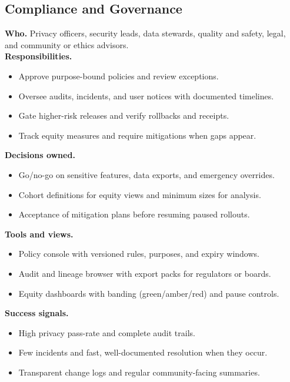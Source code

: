 \documentclass[12pt]{article}
\begin{document}
\subsection*{Compliance and Governance}
\textbf{Who.} Privacy officers, security leads, data stewards, quality and safety, legal, and community or ethics advisors.\\
\textbf{Responsibilities.}
\begin{itemize}[leftmargin=*]
  \item Approve purpose-bound policies and review exceptions.
  \item Oversee audits, incidents, and user notices with documented timelines.
  \item Gate higher-risk releases and verify rollbacks and receipts.
  \item Track equity measures and require mitigations when gaps appear.
\end{itemize}
\textbf{Decisions owned.}
\begin{itemize}[leftmargin=*]
  \item Go/no-go on sensitive features, data exports, and emergency overrides.
  \item Cohort definitions for equity views and minimum sizes for analysis.
  \item Acceptance of mitigation plans before resuming paused rollouts.
\end{itemize}
\textbf{Tools and views.}
\begin{itemize}[leftmargin=*]
  \item Policy console with versioned rules, purposes, and expiry windows.
  \item Audit and lineage browser with export packs for regulators or boards.
  \item Equity dashboards with banding (green/amber/red) and pause controls.
\end{itemize}
\textbf{Success signals.}
\begin{itemize}[leftmargin=*]
  \item High privacy pass-rate and complete audit trails.
  \item Few incidents and fast, well-documented resolution when they occur.
  \item Transparent change logs and regular community-facing summaries.
\end{itemize}
\end{document}
